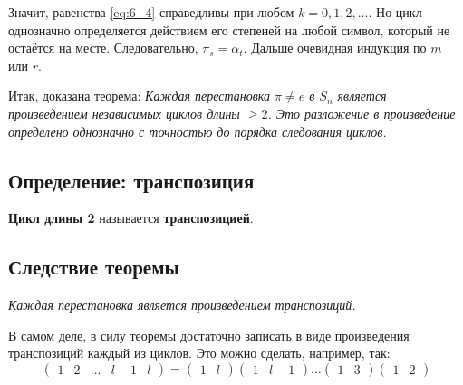 \documentclass{article}
\begin{document}
Значит, равенства \eqref{eq:6_4} справедливы при любом $k = 0, 1, 2, \dots$. Но цикл однозначно определяется действием его степеней на любой символ, который не остаётся на месте. Следовательно, $\pi_s = \alpha_t$. Дальше очевидная индукция по $m$ или $r$.

Итак, доказана теорема: \textit{Каждая перестановка $\pi \neq e$ в $S_n$ является произведением независимых циклов длины $\geq 2$. Это разложение в произведение определено однозначно с точностью до порядка следования циклов.}

\subsection{Определение: транспозиция}
\textbf{Цикл длины 2} называется \textbf{транспозицией}.

\subsection{Следствие теоремы}
\textit{Каждая перестановка является произведением транспозиций.}

В самом деле, в силу теоремы достаточно записать в виде произведения транспозиций каждый из циклов. Это можно сделать, например, так:
\[(\begin{matrix}1&2&\dots&l-1&l\end{matrix}) = (\begin{matrix}1 & l\end{matrix})(\begin{matrix}1 & l-1\end{matrix})\dots(\begin{matrix}1 & 3\end{matrix})(\begin{matrix}1 & 2\end{matrix})\]
\end{document}
